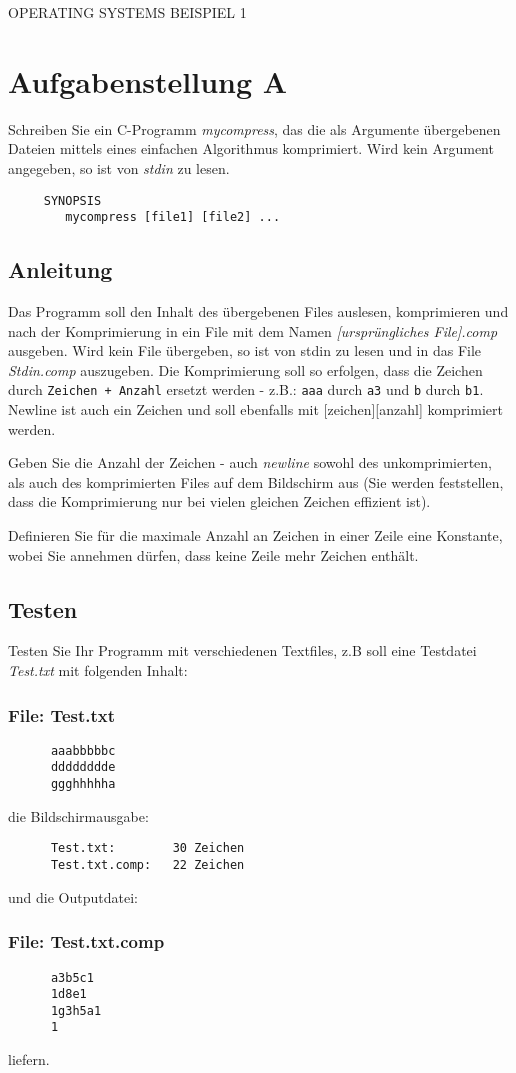 \documentclass{article}
\begin{document}
\begin{center}
\begin{Large}
OPERATING SYSTEMS BEISPIEL 1
\end{Large}
\end{center}
 
\section*{Aufgabenstellung A}
       Schreiben Sie ein C-Programm \emph{mycompress},
      das die als Argumente übergebenen Dateien mittels
      eines einfachen Algorithmus komprimiert.
      Wird kein Argument angegeben, so ist von
      \emph{stdin} zu lesen.
\begin{verbatim}
	 SYNOPSIS
        mycompress [file1] [file2] ...
\end{verbatim}

\subsection*{Anleitung}
      Das Programm soll den Inhalt des übergebenen Files
      auslesen, komprimieren und nach der Komprimierung in ein
      File mit dem Namen \emph{[ursprüngliches File].comp}
      ausgeben. Wird kein File übergeben, so ist von stdin zu
      lesen und in das File \emph{Stdin.comp} auszugeben. Die
      Komprimierung soll so erfolgen, dass die Zeichen durch
      \verb|Zeichen + Anzahl| ersetzt werden - z.B.: \verb|aaa| durch \verb|a3|
      und \verb|b| durch \verb|b1|. 
	Newline ist auch ein Zeichen und soll ebenfalls mit [zeichen][anzahl] komprimiert werden.
      
      Geben Sie die Anzahl der Zeichen - auch \emph{newline}
      sowohl des unkomprimierten, als auch des komprimierten Files
      auf dem Bildschirm aus (Sie werden feststellen, dass die
      Komprimierung nur bei vielen gleichen Zeichen effizient ist).

 	
      
      Definieren Sie für die maximale Anzahl an Zeichen in einer
      Zeile eine Konstante, wobei Sie annehmen dürfen, dass keine
      Zeile mehr Zeichen enthält.

      
\subsection*{Testen}
      Testen Sie Ihr Programm mit verschiedenen Textfiles, z.B
      soll eine Testdatei \emph{Test.txt} mit folgenden Inhalt:
\subsubsection*{File: Test.txt}
\begin{verbatim}
      aaabbbbbc
      dddddddde
      ggghhhhha
\end{verbatim}
die Bildschirmausgabe:
\begin{verbatim}
      Test.txt:        30 Zeichen
      Test.txt.comp:   22 Zeichen
\end{verbatim}

und die Outputdatei:

\subsubsection*{File: Test.txt.comp}
\begin{verbatim}
      a3b5c1
      1d8e1
      1g3h5a1
      1
\end{verbatim}

liefern.
    	
	
\end{document}
